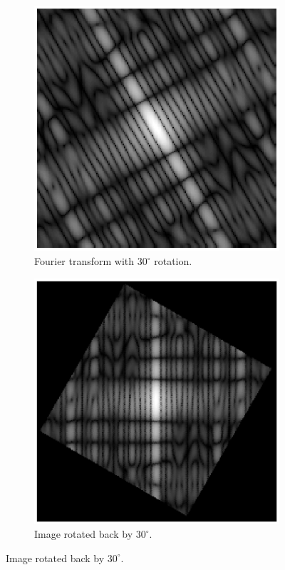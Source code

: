 \documentclass[11pt,a4paper]{article}
\begin{document}
\begin{itemize}
\begin{figure}[!ht]
\begin{subfigure}[t]{.32\linewidth}
		\includegraphics[width=\columnwidth]{Rotation_G_30_Shifted_Fourier.eps}
		\caption{\scriptsize Fourier transform with $30^{\circ}$ rotation.}
		\label{fig:rotated30Fourier}
		\end{subfigure}
		\begin{subfigure}[t]{.32\linewidth} %
		\includegraphics[width=\columnwidth]{Rotation_G_30_Fourier_Back.eps}
		\caption{\scriptsize Image rotated back by $30^{\circ}$.}
		\label{fig:rotated30Back}
		\end{subfigure}
		

\end{figure}
\end{itemize}
\end{document}
